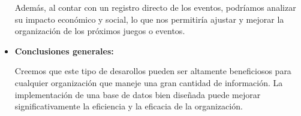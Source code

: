 \begin{itemize}
    Además, al contar con un registro directo de los eventos, podríamos analizar su impacto económico y social, lo que nos permitiría ajustar y mejorar la organización de los próximos juegos o eventos. \vspace{0.5cm}

    \item \textbf{Conclusiones generales:} \vspace{0.5cm}
    
    Creemos que este tipo de desarollos pueden ser altamente beneficiosos para cualquier organización que maneje una gran cantidad de información. La implementación de una base de datos bien diseñada puede mejorar significativamente la eficiencia y la eficacia de la organización. \vspace{0.5cm}
\end{itemize}
